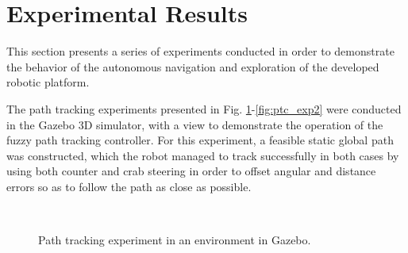 \documentclass[conference]{IEEEtran}
\begin{document}
\section{Experimental Results} \label{sec:results}
This section presents a series of experiments conducted in order to demonstrate the behavior of the autonomous navigation and exploration of the developed robotic platform.

The path tracking experiments presented in Fig. \ref{fig:ptc_exp1}-\ref{fig:ptc_exp2} were conducted in the Gazebo 3D simulator, with a view to demonstrate the operation of the fuzzy path tracking controller. For this experiment, a feasible static global path was constructed, which the robot managed to track successfully in both cases by using both counter and crab steering in order to offset angular and distance errors so as to follow the path as close as possible.

\begin{figure}[!ht]
	\centering
	\\[-0.05cm]%
	\caption{Path tracking experiment in an environment in Gazebo.}
	\label{fig:ptc_exp1}
\end{figure}
\end{document}
